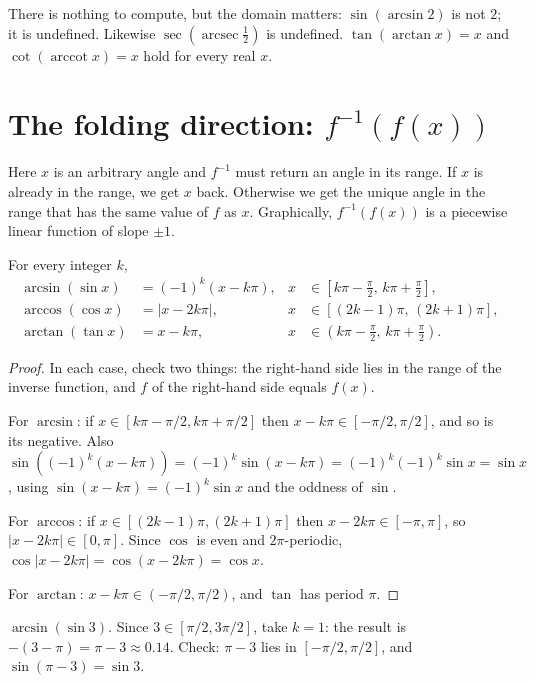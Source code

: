 \documentclass{essay}
\DeclareMathOperator{\arcsec}{arcsec}
\DeclareMathOperator{\arccot}{arccot}
\begin{document}
There is nothing to compute, but the domain matters: $\sin(\arcsin 2)$ is
not $2$; it is undefined. Likewise $\sec(\arcsec \tfrac12)$ is undefined.
$\tan(\arctan x) = x$ and $\cot(\arccot x) = x$ hold for every real $x$.

\section{The folding direction: $f^{-1}(f(x))$}

Here $x$ is an arbitrary angle and $f^{-1}$ must return an angle in its
range. If $x$ is already in the range, we get $x$ back. Otherwise we get
the unique angle in the range that has the same value of $f$ as $x$.
Graphically, $f^{-1}(f(x))$ is a piecewise linear function of slope
$\pm 1$.

\begin{proposition}\label{prop:fold}
For every integer $k$,
\begin{align*}
\arcsin(\sin x) &= (-1)^k (x - k\pi),
  & x &\in [k\pi - \tfrac{\pi}{2},\, k\pi + \tfrac{\pi}{2}], \\
\arccos(\cos x) &= |x - 2k\pi|,
  & x &\in [(2k-1)\pi,\, (2k+1)\pi], \\
\arctan(\tan x) &= x - k\pi,
  & x &\in (k\pi - \tfrac{\pi}{2},\, k\pi + \tfrac{\pi}{2}).
\end{align*}
\end{proposition}

\begin{proof}
In each case, check two things: the right-hand side lies in the range of
the inverse function, and $f$ of the right-hand side equals $f(x)$.

For $\arcsin$: if $x \in [k\pi - \pi/2, k\pi + \pi/2]$ then
$x - k\pi \in [-\pi/2, \pi/2]$, and so is its negative. Also
$\sin((-1)^k(x - k\pi)) = (-1)^k \sin(x - k\pi) = (-1)^k(-1)^k \sin x
= \sin x$, using $\sin(x - k\pi) = (-1)^k \sin x$ and the oddness of
$\sin$.

For $\arccos$: if $x \in [(2k-1)\pi, (2k+1)\pi]$ then
$x - 2k\pi \in [-\pi, \pi]$, so $|x - 2k\pi| \in [0, \pi]$. Since
$\cos$ is even and $2\pi$-periodic,
$\cos|x - 2k\pi| = \cos(x - 2k\pi) = \cos x$.

For $\arctan$: $x - k\pi \in (-\pi/2, \pi/2)$, and $\tan$ has period
$\pi$.
\end{proof}

\begin{example}
$\arcsin(\sin 3)$. Since $3 \in [\pi/2, 3\pi/2]$, take $k = 1$:
the result is $-(3 - \pi) = \pi - 3 \approx 0.14$. Check: $\pi - 3$ lies
in $[-\pi/2, \pi/2]$, and $\sin(\pi - 3) = \sin 3$.
\end{example}
\end{document}
